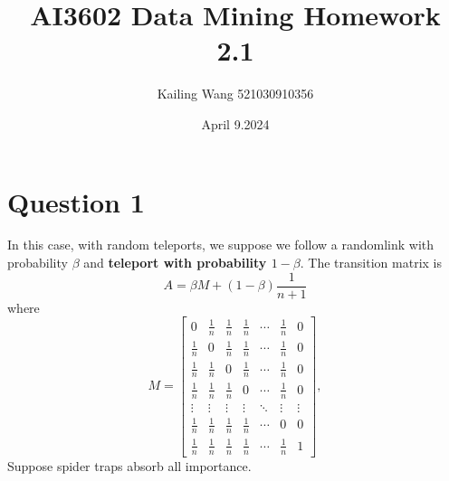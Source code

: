 \documentclass{article}
\begin{document}
\title{AI3602 Data Mining Homework 2.1}
\author{Kailing Wang 521030910356}
\date{April 9.2024}
\maketitle

\section*{Question 1}
In this case, with random teleports, we suppose we follow a randomlink with probability $\beta$ and \textbf{teleport with probability $1-\beta$}. The transition matrix is
\begin{equation}
	A = \beta M + (1-\beta)\frac{1}{n+1}
\end{equation}
where
\begin{equation}
	M = \begin{bmatrix}
		0           & \frac{1}{n} & \frac{1}{n} & \frac{1}{n} & \cdots & \frac{1}{n} & 0      \\
		\frac{1}{n} & 0           & \frac{1}{n} & \frac{1}{n} & \cdots & \frac{1}{n} & 0      \\
		\frac{1}{n} & \frac{1}{n} & 0           & \frac{1}{n} & \cdots & \frac{1}{n} & 0      \\
		\frac{1}{n} & \frac{1}{n} & \frac{1}{n} & 0           & \cdots & \frac{1}{n} & 0      \\
		\vdots      & \vdots      & \vdots      & \vdots      & \ddots & \vdots      & \vdots \\
		\frac{1}{n} & \frac{1}{n} & \frac{1}{n} & \frac{1}{n} & \cdots & 0           & 0      \\
		\frac{1}{n} & \frac{1}{n} & \frac{1}{n} & \frac{1}{n} & \cdots & \frac{1}{n} & 1
	\end{bmatrix},
\end{equation}
Suppose spider traps absorb all importance.
\end{document}
